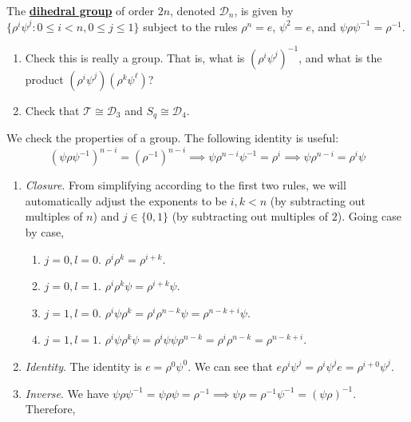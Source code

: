   \begin{exercise}[Shifrin 6.2.15.a/b]
    The \textbf{\hyperref[def:dihedral-group]{dihedral group}} of order $2n$, denoted $\mathcal{D}_n$, is given by $\{\rho^i\psi^j : 0 \leq i < n, 0 \leq j \leq 1\}$ subject to the rules $\rho^n = e$, $\psi^2 = e$, and $\psi\rho\psi^{-1} = \rho^{-1}$.
    \begin{enumerate}
      \item Check this is really a group. That is, what is $(\rho^i\psi^j)^{-1}$, and what is the product $(\rho^i\psi^j)(\rho^k\psi^\ell)$?
      \item Check that $\mathcal{T} \cong \mathcal{D}_3$ and $S_q \cong \mathcal{D}_4$.
    \end{enumerate}
  \end{exercise}
  \begin{solution}
    We check the properties of a group. The following identity is useful: 
    \begin{equation}
      (\psi \rho \psi^{-1})^{n-i} = (\rho^{-1})^{n-i} \implies \psi \rho^{n-i} \psi^{-1} = \rho^i \implies \psi \rho^{n-i} = \rho^i \psi
    \end{equation}
    \begin{enumerate}
      \item \textit{Closure}. From simplifying according to the first two rules, we will automatically adjust the exponents to be $i, k < n$ (by subtracting out multiples of $n$) and $j \in \{0, 1\}$ (by subtracting out multiples of $2$). Going case by case, 
      \begin{enumerate}
        \item $j = 0, l = 0$. $\rho^i \rho^k = \rho^{i+k}$. 
        \item $j = 0, l = 1$. $\rho^i \rho^k \psi = \rho^{i+k} \psi$. 
        \item $j = 1, l = 0$. $\rho^i \psi \rho^k = \rho^i \rho^{n-k} \psi = \rho^{n-k+i} \psi$. 
        \item $j = 1, l = 1$. $\rho^i \psi \rho^k \psi = \rho^i \psi \psi \rho^{n-k} = \rho^i \rho^{n-k} = \rho^{n-k+i}$. 
      \end{enumerate}
      \item \textit{Identity}. The identity is $e = \rho^0 \psi^0$. We can see that $e \rho^i \psi^j = \rho^i \psi^j e = \rho^{i+0} \psi^j$. 
      \item \textit{Inverse}. We have $\psi \rho \psi^{-1} = \psi \rho \psi = \rho^{-1} \implies \psi \rho = \rho^{-1} \psi^{-1} = (\psi \rho)^{-1}$. Therefore, 
      \begin{equation}

\end{equation}
\end{enumerate}
\end{solution}
